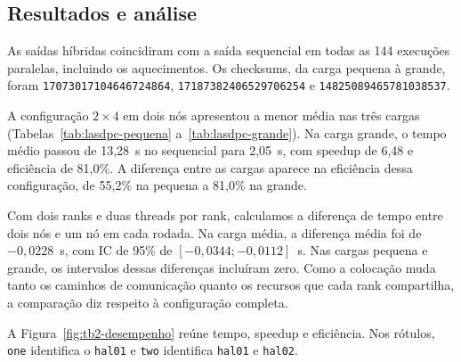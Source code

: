 \subsection{Resultados e análise}

As saídas híbridas coincidiram com a saída sequencial em todas as
144 execuções paralelas, incluindo os aquecimentos. Os checksums,
da carga pequena à grande, foram
\texttt{17073017104646724864}, \texttt{17187382406529706254} e
\texttt{14825089465781038537}.

A configuração $2\times4$ em dois nós apresentou a menor média nas
três cargas (Tabelas~\ref{tab:lasdpc-pequena} a~\ref{tab:lasdpc-grande}).
Na carga grande, o tempo médio passou de 13,28~s no sequencial para
2,05~s, com speedup de 6,48 e eficiência de 81,0\%. A diferença entre
as cargas aparece na eficiência dessa configuração, de 55,2\% na
pequena a 81,0\% na grande.

Com dois ranks e duas threads por rank, calculamos a diferença
de tempo entre dois nós e um nó em cada rodada. Na carga média,
a diferença média foi de $-0{,}0228$~s, com IC de 95\% de
$[-0{,}0344; -0{,}0112]$~s. Nas cargas pequena e grande, os
intervalos dessas diferenças incluíram zero. Como a colocação
muda tanto os caminhos de comunicação quanto os recursos que cada
rank compartilha, a comparação diz respeito à configuração completa.

A Figura~\ref{fig:tb2-desempenho} reúne tempo, speedup e eficiência.
Nos rótulos, \texttt{one} identifica o \texttt{hal01} e
\texttt{two} identifica \texttt{hal01} e \texttt{hal02}.
